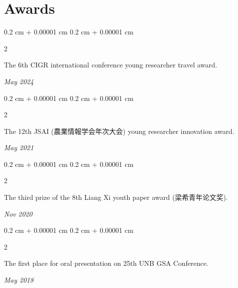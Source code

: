\documentclass[10pt, a4paper]{article}
\newcommand{\textchinese}[1]{{\CJKfamily{chinese}#1}}
\newenvironment{onecolentry}{
    \begin{adjustwidth}{
        0.2 cm + 0.00001 cm
    }{
        0.2 cm + 0.00001 cm
    }
}{
    \end{adjustwidth}
} %
\newenvironment{twocolentry}[2][]{
    \onecolentry
    \def\secondColumn{#2}
    \setcolumnwidth{\fill, 4.5 cm}
    \begin{paracol}{2}
}{
    \switchcolumn \raggedleft \secondColumn
    \end{paracol}
    \endonecolentry
} %
\let\hrefWithoutArrow\href
\renewcommand{\href}[2]{\hrefWithoutArrow{#1}{\ifthenelse{\equal{#2}{}}{ }{#2 }\raisebox{.15ex}{\footnotesize \faExternalLink*}}}
\begin{document}


    \section{Awards}

        \begin{twocolentry}{
            \textit{May 2024}}
            The 6th CIGR international conference young researcher travel award.
        \end{twocolentry}

        \vspace{0.10 cm}

        \begin{twocolentry}{
            \textit{May 2021}}
            The 12th JSAI (農業情報学会年次大会) young researcher innovation award.
        \end{twocolentry}

        \vspace{0.10 cm}

        \begin{twocolentry}{
            \textit{Nov 2020}}
            The third prize of the 8th Liang Xi youth paper award (\textchinese{梁希青年论文奖}).
        \end{twocolentry}
        
        \vspace{0.10 cm}

        \begin{twocolentry}{
            \textit{May 2018}}
            The first place for oral presentation on 25th UNB GSA Conference.
        \end{twocolentry}


    



        




    
\end{document}
